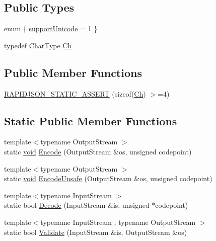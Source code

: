\subsection*{Public Types}
\begin{DoxyCompactItemize}
\item 
enum \{ \hyperlink{structUTF32_ab0e36a7527093764bfa9f0a504187fc3ae44852fd9d88deed3a956b89108412a5}{support\+Unicode} = 1
 \}
\item 
typedef Char\+Type \hyperlink{structUTF32_ab4502672d56436e730ca5f647bb52be9}{Ch}
\end{DoxyCompactItemize}
\subsection*{Public Member Functions}
\begin{DoxyCompactItemize}
\item 
\hyperlink{structUTF32_aae11b766f799d311679d59e9f7077f83}{R\+A\+P\+I\+D\+J\+S\+O\+N\+\_\+\+S\+T\+A\+T\+I\+C\+\_\+\+A\+S\+S\+E\+RT} (sizeof(\hyperlink{structUTF32_ab4502672d56436e730ca5f647bb52be9}{Ch}) $>$=4)
\end{DoxyCompactItemize}
\subsection*{Static Public Member Functions}
\begin{DoxyCompactItemize}
\item 
{\footnotesize template$<$typename Output\+Stream $>$ }\\static \hyperlink{imgui__impl__opengl3__loader_8h_ac668e7cffd9e2e9cfee428b9b2f34fa7}{void} \hyperlink{structUTF32_a511d1b09672ce535085895a28d8c2f13}{Encode} (Output\+Stream \&os, unsigned codepoint)
\item 
{\footnotesize template$<$typename Output\+Stream $>$ }\\static \hyperlink{imgui__impl__opengl3__loader_8h_ac668e7cffd9e2e9cfee428b9b2f34fa7}{void} \hyperlink{structUTF32_ae50dd8dff92c36ee184c6d4eccb1961e}{Encode\+Unsafe} (Output\+Stream \&os, unsigned codepoint)
\item 
{\footnotesize template$<$typename Input\+Stream $>$ }\\static bool \hyperlink{structUTF32_a6e7258a5e982e101345dffdc355e9b53}{Decode} (Input\+Stream \&is, unsigned $\ast$codepoint)
\item 
{\footnotesize template$<$typename Input\+Stream , typename Output\+Stream $>$ }\\static bool \hyperlink{structUTF32_a71336fb0546b3079e01bbd51d2fa2e45}{Validate} (Input\+Stream \&is, Output\+Stream \&os)
\end{DoxyCompactItemize}


